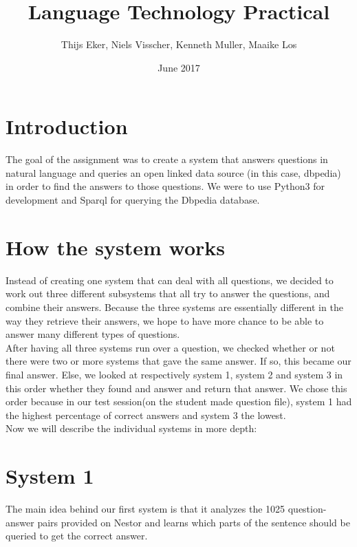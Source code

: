 \documentclass{article}
\title{Language Technology Practical}
\author{Thijs Eker, Niels Visscher, Kenneth Muller, Maaike Los }
\date{June 2017}
\begin{document}
\maketitle

\section{Introduction}

The goal of the assignment was to create a system that answers questions in natural language and queries an open linked data source (in this case, dbpedia) in order to find the answers to those questions. We were to use Python3 for development and Sparql for querying the Dbpedia database.

\section{How the system works}
Instead of creating one system that can deal with all questions, we decided to work out three different subsystems that all try to answer the questions, and combine their answers. Because the three systems are essentially different in the way they retrieve their answers, we hope to have more chance to be able to answer many different types of questions. \\
After having all three systems run over a question, we checked whether or not there were two or more systems that gave the same answer. If so, this became our final answer. Else, we looked at respectively system 1, system 2 and system 3 in this order whether they found and answer and return that answer. We chose this order because in our test session(on the student made question file), system 1 had the highest percentage of correct answers and system 3 the lowest.\\

Now we will describe the individual systems in more depth:

\section*{System 1}
The main idea behind our first system is that it analyzes the 1025 question-answer pairs provided on Nestor and learns which parts of the sentence should be queried to get the correct answer.
\end{document}
